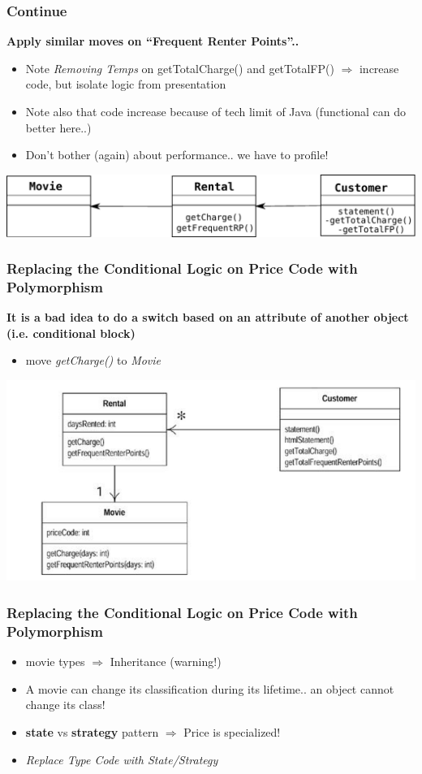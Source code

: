 \documentclass{beamer}
\begin{document}
\begin{frame}
  \frametitle{Continue}
  \textbf{Apply similar moves on ``Frequent Renter Points''.. }
     \begin{itemize}
  		\item Note \textit{Removing Temps} on getTotalCharge() and getTotalFP() $\Rightarrow$ increase code, but isolate logic from presentation
  		\item Note also that code increase because of tech limit of Java (functional can do better here..)
  		\item Don't bother (again) about performance.. we have to profile!
  	\end{itemize}
  	\begin{center}
		\includegraphics[scale=0.5]{refactorApply}
	\end{center}
\end{frame}

\begin{frame}
  \frametitle{Replacing the Conditional Logic on Price Code with Polymorphism}
  \textbf{It is a bad idea to do a switch based on an attribute of another object (i.e. conditional block)}
     \begin{itemize}
  		\item move \textit{getCharge()} to \textit{Movie}
  	\end{itemize}
  	\begin{center}
		\includegraphics[scale=0.3]{condPoly1}
	\end{center}
\end{frame}

\begin{frame}
  \frametitle{Replacing the Conditional Logic on Price Code with Polymorphism}
     \begin{itemize}
  		\item movie types $\Rightarrow$ Inheritance (warning!)
  		\item A movie can change its classification during its lifetime.. an object cannot change its class!
  		\item \textbf{state} vs \textbf{strategy} pattern $\Rightarrow$ Price is specialized!
  		\item \textit{Replace Type Code with State/Strategy}
  	\end{itemize}
\end{frame}
\end{document}
